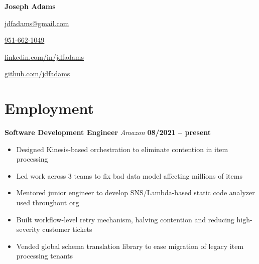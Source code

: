 \documentclass[11pt]{article}
\title{\fullname}
\makeatletter
\newcommand\fullname{Joseph Adams}
\newcommand\email{jdfadams@gmail.com}
\newcommand\phone{951-662-1049}
\newcommand\verticalspace{\vspace{0.5cm}}
\makeatother
\begin{document}
\begin{center}
  \textbf{\Large\fullname} \\[\baselineskip]
  \begin{inparaitem}
    \item \href{mailto:\email}{\email}
    \item \href{tel:\phone}{\phone}
    \item \href{http://linkedin.com/in/jdfadams}{linkedin.com/in/jdfadams}
    \item \href{http://github.com/jdfadams}{github.com/jdfadams}
  \end{inparaitem}
\end{center}

\section*{Employment}
\textbf{Software Development Engineer} \emph{Amazon} \hfill \textbf{08/2021 -- present}
\begin{itemize}
  \item Designed Kinesis-based orchestration to eliminate contention in item processing
  \item Led work across 3 teams to fix bad data model affecting millions of items
  \item Mentored junior engineer to develop SNS/Lambda-based static code analyzer used throughout org
  \item Built workflow-level retry mechanism, halving contention and reducing high-severity customer tickets
  \item Vended global schema translation library to ease migration of legacy item processing tenants
\end{itemize}

\verticalspace
\end{document}
